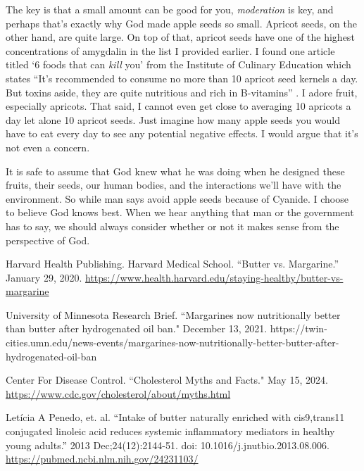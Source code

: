 \documentclass[9.5pt]{article}
\begin{document}
\begin{multicols}{2}
The key is that a small amount can be good for you, \textit{moderation} is key, and perhaps that's exactly why God made apple seeds so small. Apricot seeds, on the other hand, are quite large. On top of that, apricot seeds have one of the highest concentrations of amygdalin in the list I provided earlier. I found one article titled `6 foods that can \textit{kill} you' from the Institute of Culinary Education which states ``It's recommended to consume no more than 10 apricot seed kernels a day. But toxins aside, they are quite nutritious and rich in B-vitamins” \cite{apricot seeds}. I adore fruit, especially apricots. That said, I cannot even get close to averaging 10 apricots a day let alone 10 apricot seeds. Just imagine how many apple seeds you would have to eat every day to see any potential negative effects. I would argue that it's not even a concern.

It is safe to assume that God knew what he was doing when he designed these fruits, their seeds, our human bodies, and the interactions we'll have with the environment. So while man says avoid apple seeds because of Cyanide. I choose to believe God knows best. When we hear anything that man or the government has to say, we should always consider whether or not it makes sense from the perspective of God.


\begin{thebibliography}{9}
	{\footnotesize	
	
	 Harvard Health Publishing. Harvard Medical School. ``Butter vs. Margarine.''  January 29, 2020. \url{https://www.health.harvard.edu/staying-healthy/butter-vs-margarine}
		
	 University of Minnesota Research Brief. ``Margarines now nutritionally better than butter after hydrogenated oil ban."  December 13, 2021. https://twin-cities.umn.edu/news-events/margarines-now-nutritionally-better-butter-after-hydrogenated-oil-ban
	
	 Center For Disease Control. ``Cholesterol Myths and Facts." May 15, 2024. \url{https://www.cdc.gov/cholesterol/about/myths.html}	
	
	 Letícia A Penedo, et. al. ``Intake of butter naturally enriched with cis9,trans11 conjugated linoleic acid reduces systemic inflammatory mediators in healthy young adults.'' 2013 Dec;24(12):2144-51.
	doi: 10.1016/j.jnutbio.2013.08.006. \url{https://pubmed.ncbi.nlm.nih.gov/24231103/}
	
}
\end{thebibliography}
\end{multicols}
\end{document}
